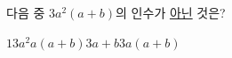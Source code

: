 다음 중 $3a^2(a+b)$의 인수가 \underline{아닌} 것은?
\begin{choices32}{$1$}{$3a^2$}{$a(a+b)$}{$3a+b$}{$3a(a+b)$}\end{choices32}

